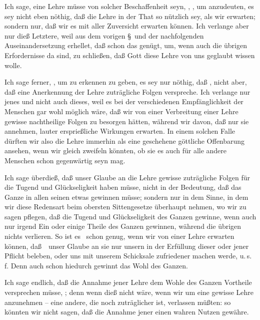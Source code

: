 \begin{aufza}
\item Ich sage, eine Lehre müsse von solcher Beschaffenheit seyn, , \usw , um anzudeuten, es sey nicht eben nöthig, daß die Lehre in der That so nützlich sey, als wir erwarten; sondern nur, daß wir es mit aller Zuversicht erwarten können. Ich verlange aber nur dieß Letztere, weil aus dem vorigen §\ und der nachfolgenden Auseinandersetzung erhellet, daß schon das genügt, um, wenn auch die übrigen Erfordernisse da sind, zu schließen, daß Gott diese Lehre von uns geglaubt wissen wolle.
\item Ich sage ferner, , um zu erkennen zu geben, es sey nur nöthig, daß , nicht aber, daß eine  Anerkennung der Lehre zuträgliche Folgen verspreche. Ich verlange nur jenes und nicht auch dieses, weil es bei der verschiedenen Empfänglichkeit der Menschen gar wohl möglich wäre, daß wir von einer  Verbreitung einer Lehre gewisse nachtheilige Folgen zu besorgen hätten, während wir davon, daß nur  sie annehmen, lauter ersprießliche Wirkungen erwarten. In einem solchen Falle dürften wir also die Lehre immerhin als eine  geschehene göttliche Offenbarung ansehen, wenn wir gleich zweifeln könnten, ob sie es auch für alle andere Menschen schon gegenwärtig seyn mag.
\item Ich sage überdieß, daß unser Glaube an die Lehre gewisse zuträgliche Folgen für die Tugend und Glückseligkeit  haben müsse, nicht in der Bedeutung, daß das Ganze in allen seinen  etwas gewinnen müsse; sondern nur in dem Sinne, in dem wir diese Redensart beim obersten Sittengesetze überhaupt nehmen, wo wir zu sagen pflegen, daß die Tugend und Glückseligkeit des Ganzen gewinne, wenn auch nur irgend Ein oder einige Theile des Ganzen gewinnen, während die übrigen nichts verlieren. So ist es \zB\ schon genug, wenn wir von einer Lehre erwarten können, daß~\ unser Glaube an sie nur unsern  in der Erfüllung dieser oder jener Pflicht beleben, oder uns mit unserem Schicksale zufriedener machen werde, u.\,s.\,f. Denn auch schon hiedurch gewinnt das Wohl des Ganzen.
\item Ich sage endlich, daß die Annahme jener Lehre dem Wohle des Ganzen  Vortheile versprechen müsse, ; denn wenn dieß nicht wäre, wenn wir um eine gewisse Lehre anzunehmen -- eine andere, die noch zuträglicher ist, verlassen müßten: so könnten wir nicht sagen, daß die Annahme jener einen wahren Nutzen gewähre.
\end{aufza}


